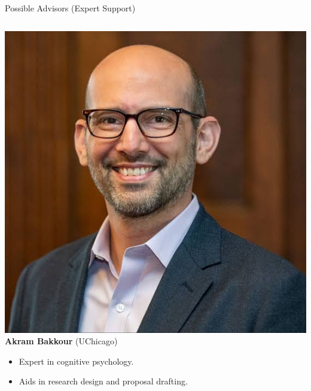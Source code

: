 \documentclass[pdf]{beamer}
\begin{document}
\begin{frame}{Possible Advisors (Expert Support)}
\begin{columns}

\begin{column}{0.5\textwidth}
\centering
\includegraphics[width=0.8\linewidth]{screenshots/Akram Bakkour.png}\\
\textbf{Akram Bakkour} (UChicago)
\begin{itemize}
    \item Expert in cognitive psychology.
    \item Aids in research design and proposal drafting.
\end{itemize}
\end{column}


\end{columns}
\end{frame}
\end{document}

